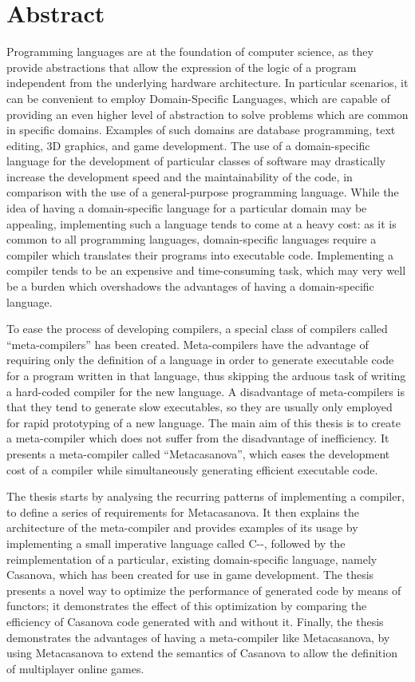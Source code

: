 \chapter*{Abstract}
\thispagestyle{empty}

Programming languages are at the foundation of computer science, as
they provide abstractions that allow the expression of the logic of a program independent
from the underlying hardware architecture. In particular scenarios,
it can be convenient to employ Domain-Specific Languages, which are
capable of providing an even higher level of abstraction to solve problems
which are common in specific domains. Examples of such domains are database programming, text editing,
3D graphics, and game development. The use of a domain-specific
language for the development of particular classes of software
may drastically increase the development speed and the maintainability
of the code, in comparison with the use of a general-purpose
programming language. While the idea of having a domain-specific language for a particular domain
may be appealing, implementing such a language tends to come at a heavy cost: as it is common to all programming
languages, domain-specific languages require a compiler which translates their
programs into executable code. Implementing
a compiler tends to be an expensive and time-consuming task, which may very well be a burden
which overshadows the advantages of having a domain-specific language.

To ease the process of developing
compilers, a special class of compilers called ``meta-compilers'' has been
created. Meta-compilers have the advantage of requiring only the definition of a language in order to
generate executable code for a program written in that language, thus
skipping the arduous task of writing a hard-coded compiler for the new language. A disadvantage of
meta-compilers is that they tend to generate slow executables, so they are usually only employed
for rapid prototyping of a new language. The main aim of this thesis is to create a meta-compiler
which does not suffer from the disadvantage of inefficiency. It presents a meta-compiler called
``Metacasanova'', which eases the development cost of a compiler while simultaneously
generating efficient executable code.

The thesis starts by analysing the recurring
patterns of implementing a compiler, to define a series of requirements for Metacasanova.
It then explains the architecture of the meta-compiler and provides examples of its
usage by implementing a small imperative language called C-{}-, followed by the
reimplementation of a particular, existing domain-specific language, namely Casanova,
which has been created for use in game development. The thesis presents a novel way to
optimize the performance of generated code by means of functors; it demonstrates the
effect of this optimization by comparing the efficiency of Casanova code generated with and without it.
Finally, the thesis demonstrates the advantages of having a meta-compiler like Metacasanova,
by using Metacasanova to extend the semantics of Casanova to allow the definition of multiplayer online games.